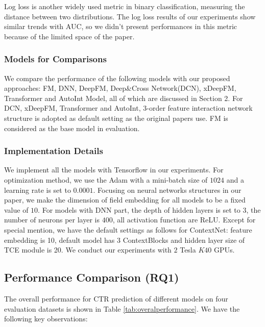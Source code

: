 \documentclass[sigconf]{acmart}
\begin{document}
Log loss is another widely used metric in binary classification, measuring the distance between two distributions. The log loss results of our experiments show similar trends with AUC, so we didn't  present performances in this metric because of the limited space of the paper.




\subsubsection{Models for Comparisons}
We compare the performance of the following models with our proposed approaches: FM, DNN, DeepFM, Deep\&Cross Network(DCN), xDeepFM, Transformer and AutoInt Model, all of which are discussed in Section 2. For DCN, xDeepFM, Transformer and AutoInt, $3$-order feature interaction network structure is adopted as default setting as the original papers use. FM is considered as the base model in evaluation.


\subsubsection{Implementation Details}
We implement all the models with Tensorflow in our experiments. For optimization method, we use the Adam with a mini-batch size of $1024$ and a learning rate is set to $0.0001$.  Focusing on neural networks structures in our paper, we make the dimension of field embedding for all models to be a fixed value of $10$. For models with DNN part, the depth of hidden layers is set to $3$, the number of neurons per layer is $400$, all activation function are ReLU. Except for special mention, we have the default settings as follows for ContextNet: feature embedding is 10, default model has 3 ContextBlocks and hidden layer size of TCE module is 20. We conduct our experiments with $2$ Tesla $K40$ GPUs.





\subsection{Performance Comparison (RQ1)}
The overall performance for CTR prediction of different models on four evaluation datasets is shown in Table \ref{tab:overalperformance}. We have the following key observations:
\end{document}
